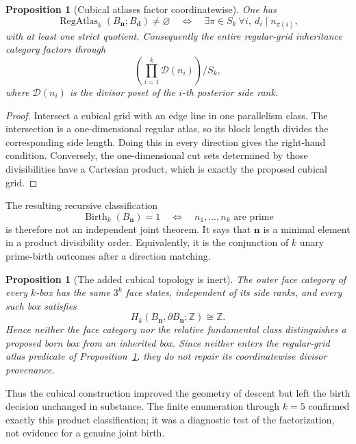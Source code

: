 \documentclass[11pt]{article}
\newtheorem{proposition}[theorem]{Proposition}
\newcommand{\RegAtlas}{\operatorname{RegAtlas}}
\newcommand{\Birth}{\operatorname{Birth}}
\begin{document}
\begin{proposition}[Cubical atlases factor coordinatewise]
\label{prop:cubical-product-divisor}
One has
\[
\boxed{
\RegAtlas_k(B_{\mathbf n};B_{\mathbf d})\ne\varnothing
\quad\Longleftrightarrow\quad
\exists\pi\in S_k\ 
\forall i,\ d_i\mid n_{\pi(i)},
}
\]
with at least one strict quotient.  Consequently the entire regular-grid
inheritance category factors through
\[
\left(\prod_{i=1}^k\mathcal D(n_i)\right)\big/S_k,
\]
where \(\mathcal D(n_i)\) is the divisor poset of the \(i\)-th posterior side
rank.
\end{proposition}

\begin{proof}
Intersect a cubical grid with an edge line in one parallelism class.  The
intersection is a one-dimensional regular atlas, so its block length divides
the corresponding side length.  Doing this in every direction gives the
right-hand condition.  Conversely, the one-dimensional cut sets determined by
those divisibilities have a Cartesian product, which is exactly the proposed
cubical grid.
\end{proof}

The resulting recursive classification
\[
\Birth_k(B_{\mathbf n})=1
\quad\Longleftrightarrow\quad
n_1,\ldots,n_k\text{ are prime}
\]
is therefore not an independent joint theorem.  It says that \(\mathbf n\) is
a minimal element in a product divisibility order.  Equivalently, it is the
conjunction of \(k\) unary prime-birth outcomes after a direction matching.

\begin{proposition}[The added cubical topology is inert]
\label{prop:cubical-inert}
The outer face category of every \(k\)-box has the same \(3^k\) face states,
independent of its side ranks, and every such box satisfies
\[
H_k(B_{\mathbf n},\partial B_{\mathbf n};\mathbb Z)
\cong\mathbb Z.
\]
Hence neither the face category nor the relative fundamental class
distinguishes a proposed born box from an inherited box.  Since neither enters
the regular-grid atlas predicate of
Proposition~\ref{prop:cubical-product-divisor}, they do not repair its
coordinatewise divisor provenance.
\end{proposition}

Thus the cubical construction improved the geometry of descent but left the
birth decision unchanged in substance.  The finite enumeration through
\(k=5\) confirmed exactly this product classification; it was a diagnostic
test of the factorization, not evidence for a genuine joint birth.
\end{document}
